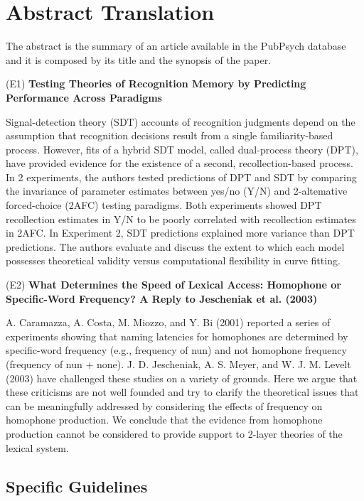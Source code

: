 \documentclass[a4paper,10pt]{article}
\newcommand{\exTit}[1]{\begin{tcolorbox}[enhanced,attach boxed title to top center={yshift=-3mm,yshifttext=-1mm},title=Examples,coltitle=black,colbacktitle=white]{#1}\end{tcolorbox}}
\begin{document}
\section{Abstract Translation}
\label{s:abstracts}


The abstract is the summary of an article available in the PubPsych database and it is composed by its title and the synopsis of the paper. 

\medskip
\exTit{
(E1) {\bf Testing Theories of Recognition Memory by Predicting Performance Across Paradigms} \par
\medskip
Signal-detection theory (SDT) accounts of recognition judgments depend on the assumption that recognition decisions result from a single familiarity-based process. However, fits of a hybrid SDT model, called dual-process theory (DPT), have provided evidence for the existence of a second, recollection-based process. In 2 experiments, the authors tested predictions of DPT and SDT by comparing the invariance of parameter estimates between yes/no (Y/N) and 2-altemative forced-choice (2AFC) testing paradigms. Both experiments showed DPT recollection estimates in Y/N to be poorly correlated with recollection estimates in 2AFC. In Experiment 2, SDT predictions explained more variance than DPT predictions. The authors evaluate and discuss the extent to which each model possesses theoretical validity versus computational flexibility in curve fitting.

\bigskip
(E2) {\bf What Determines the Speed of Lexical Access: Homophone or Specific-Word Frequency? A Reply to Jescheniak et al. (2003)} \par
\medskip
A. Caramazza, A. Costa, M. Miozzo, and Y. Bi (2001) reported a series of experiments showing that naming latencies for homophones are determined by specific-word frequency (e.g., frequency of nun) and not homophone frequency (frequency of nun + none). J. D. Jescheniak, A. S. Meyer, and W. J. M. Levelt (2003) have challenged these studies on a variety of grounds. Here we argue that these criticisms are not well founded and try to clarify the theoretical issues that can be meaningfully addressed by considering the effects of frequency on homophone production. We conclude that the evidence from homophone production cannot be considered to provide support to 2-layer theories of the lexical system.
}


\subsection{Specific Guidelines}
\label{ss:a_guidelines}
\end{document}
